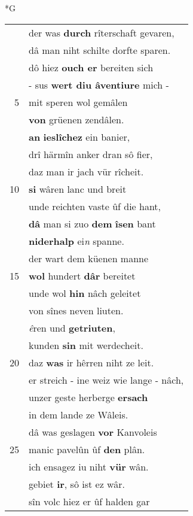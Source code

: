 \documentclass[8pt,a4paper,notitlepage]{article}
\begin{document}
\begin{table}[ht]
\begin{minipage}[t]{0.5\linewidth}
\small
\begin{center}*G
\end{center}
\begin{tabular}{rl}
 & der was \textbf{durch} rîterschaft gevaren,\\ 
 & dâ man niht schilte dorfte sparen.\\ 
 & dô hiez \textbf{ouch er} bereiten sich\\ 
 & - sus \textbf{wert diu âventiure} mich -\\ 
5 & mit speren wol gemâlen\\ 
 & \textbf{von} grüenen zendâlen.\\ 
 & \textbf{an} \textbf{ieslîchez} ein banier,\\ 
 & drî härmîn anker dran sô fier,\\ 
 & daz man ir jach vür rîcheit.\\ 
10 & \textbf{si} wâren lanc und breit\\ 
 & unde reichten vaste ûf die hant,\\ 
 & \textbf{dâ} man si zuo \textbf{dem} \textbf{îsen} bant\\ 
 & \textbf{niderhalp} ei\textit{n} spanne.\\ 
 & der wart dem küenen manne\\ 
15 & \textbf{wol} hundert \textbf{dâr} bereitet\\ 
 & unde wol \textbf{hin} nâch geleitet\\ 
 & von sînes neven liuten.\\ 
 & \textit{ê}ren und \textbf{getriuten},\\ 
 & kunden \textbf{sin} mit werdecheit.\\ 
20 & daz \textbf{was} ir hêrren niht ze leit.\\ 
 & er streich - ine weiz wie lange - nâch,\\ 
 & unzer geste herberge \textbf{ersach}\\ 
 & in dem lande ze Wâleis.\\ 
 & dâ was geslagen \textbf{vor} Kanvoleis\\ 
25 & manic pavelûn ûf \textbf{den} plân.\\ 
 & ich ensagez iu niht \textbf{vür} wân.\\ 
 & gebiet \textbf{ir}, sô ist ez wâr.\\ 
 & sîn volc hiez er ûf halden gar\\ 

\end{tabular}
\end{minipage}
\end{table}
\end{document}
